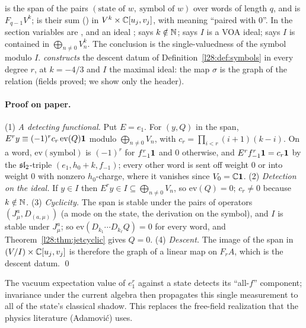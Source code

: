 \begin{dictionary}
 is the span of the pairs $(\text{state of }w,\ \text{symbol of }w)$ over words of length $q$, and  is
$F_{q-1}V^k$;  is their sum () in $V^k\times{\mathbb{C}}[u_j,v_j]$, with  meaning ``paired with $0$''. In
 the section variables are ,  and an ideal ;  says
$k\notin{\mathbb{N}}$;  says $I$ is a VOA ideal;  says $I$ is contained in $\bigoplus_{n\ne0}V^k_n$. The conclusion
 is the single-valuedness of the symbol modulo $I$.  \emph{constructs} the descent datum of
Definition~\ref{l28:def:symbols} in every degree $r$, at $k=-4/3$ and $I$ the maximal ideal: the map $\sigma$ is the graph of the relation (fields
proved; we show only the header).
\end{dictionary}

\paragraph{Proof on paper.} (1) \emph{A detecting functional.} Put $E=e_1$. For $(y,Q)$ in the span, $E^ry\equiv(-1)^rc_r\,\mathrm{ev}(Q)\mathbf 1$ modulo
$\bigoplus_{n\ne0}V_n$, with $c_r=\prod_{i<r}(i+1)(k-i)$. On a word, $\mathrm{ev}(\text{symbol})$ is $(-1)^r$ for $f_{-1}^r\mathbf 1$ and $0$ otherwise, and
$E^rf_{-1}^r\mathbf 1=c_r\mathbf 1$ by the $\mathfrak{sl}_2$-triple $(e_1,h_0+k,f_{-1})$; every other word is sent off weight $0$ or into weight $0$ with
nonzero $h_0$-charge, where it vanishes since $V_0={\mathbb{C}}\mathbf 1$. (2) \emph{Detection on the ideal.} If $y\in I$ then $E^ry\in I\subseteq\bigoplus_{n\ne0}V_n$,
so $\mathrm{ev}(Q)=0$; $c_r\ne0$ because $k\notin{\mathbb{N}}$. (3) \emph{Cyclicity.} The span is stable under the pairs of operators $(J^a_\mu,D_{(a,\mu)})$ (a mode on the
state, the derivation on the symbol), and $I$ is stable under $J^a_\mu$; so $\mathrm{ev}(D_{k_1}\cdots D_{k_\ell}Q)=0$ for every word, and
Theorem~\ref{l28:thm:jetcyclic} gives $Q=0$. (4) \emph{Descent.} The image of the span in $(V/I)\times{\mathbb{C}}[u_j,v_j]$ is therefore the graph of a linear map on
$F_rA$, which is the descent datum. \qed

\begin{physics}
The vacuum expectation value of $e_1^r$ against a state detects its ``all-$f$'' component; invariance under the current algebra then propagates this single
measurement to all of the state's classical shadow. This replaces the free-field realization that the physics literature (Adamović) uses.
\end{physics}

